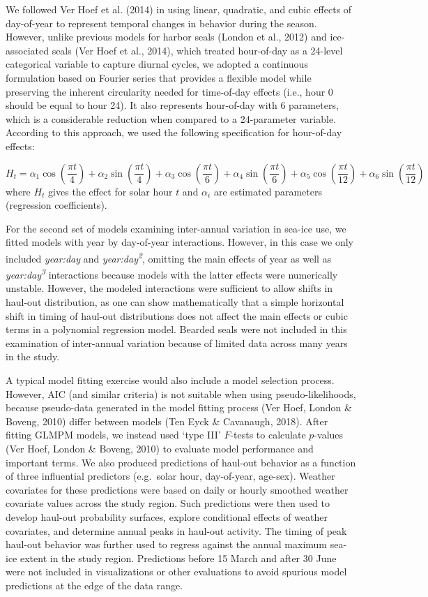 \documentclass[fleqn,10pt,lineno]{wlpeerj} %
\begin{document}
We followed Ver Hoef et al. (2014) in using linear, quadratic, and cubic
effects of day-of-year to represent temporal changes
in behavior during the season. However, unlike previous models for harbor seals
(London et al., 2012) and ice-associated seals (Ver Hoef et al., 2014), which treated
hour-of-day as a 24-level categorical variable to capture diurnal cycles, we
adopted a continuous formulation based on Fourier series that provides a
flexible model while preserving the inherent circularity needed for time-of-day
effects (i.e., hour 0 should be equal to hour 24). It also represents
hour-of-day with 6 parameters, which is a considerable reduction when compared
to a 24-parameter variable. According to this approach, we used the following
specification for hour-of-day effects:

\[
H_t=\alpha_1 \cos(\frac{\pi t}{4}) + \alpha_2 \sin(\frac{\pi t}{4}) + \alpha_3 \cos(\frac{\pi t}{6}) + \alpha_4 \sin(\frac{\pi t}{6}) + \alpha_5 \cos(\frac{\pi t}{12}) + \alpha_6 \sin(\frac{\pi t}{12})
\]
where \(H_t\) gives the effect for solar hour \(t\) and \(\alpha_{i}\) are
estimated parameters (regression coefficients).

For the second set of models examining inter-annual variation in sea-ice use, we
fitted models with year by day-of-year interactions. However, in this case we
only included \emph{year:day} and \emph{year:day\textsuperscript{2}}, omitting the main effects of year as
well as \emph{year:day\textsuperscript{3}} interactions because models with the latter effects were
numerically unstable. However, the modeled interactions were sufficient to allow
shifts in haul-out distribution, as one can show mathematically that a simple
horizontal shift in timing of haul-out distributions does not affect the main
effects or cubic terms in a polynomial regression model. Bearded seals were
not included in this examination of inter-annual variation because of limited
data across many years in the study.

A typical model fitting exercise would also include a model selection process.
However, AIC (and similar criteria) is not suitable when using
pseudo-likelihoods, because pseudo-data generated in the model fitting process
(Ver Hoef, London \& Boveng, 2010) differ between models (Ten Eyck \& Cavanaugh, 2018). After fitting GLMPM
models, we instead used `type III' \(F\)-tests to calculate \(p\)-values
(Ver Hoef, London \& Boveng, 2010) to evaluate model performance and important terms. We also
produced predictions of haul-out behavior as a function of three influential
predictors (e.g.~solar hour, day-of-year, age-sex). Weather covariates for these
predictions were based on daily or hourly smoothed weather covariate values
across the study region. Such predictions were then used to develop haul-out
probability surfaces, explore conditional effects of weather covariates, and
determine annual peaks in haul-out activity. The timing of peak haul-out
behavior was further used to regress against the annual maximum sea-ice extent
in the study region. Predictions before 15 March and after 30 June were not
included in visualizations or other evaluations to avoid spurious model
predictions at the edge of the data range.
\end{document}
